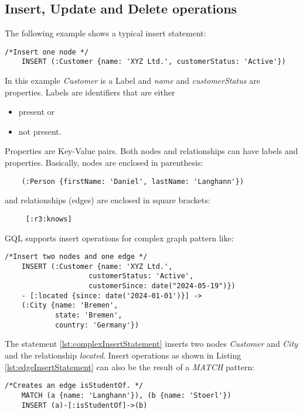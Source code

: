 \subsection{Insert, Update and Delete operations}
The following example shows a typical insert statement:
\begin{lstlisting}[caption={Typical insert statement}, label={lst:insertStatement}]
    /*Insert one node */
	INSERT (:Customer {name: 'XYZ Ltd.', customerStatus: 'Active'})
\end{lstlisting}
In this example \textit{Customer} is a Label and \textit{name} and \textit{customerStatus}
are properties.\newline
Labels are identifiers that are either
\begin{itemize}
	\item present or
	\item not present.
\end{itemize}
Properties are Key-Value pairs.\newline
Both nodes and relationships can have labels and properties.
Basically, nodes are enclosed in parenthesis:
\begin{lstlisting}
	(:Person {firstName: 'Daniel', lastName: 'Langhann'})
\end{lstlisting}
and relationships (edges) are enclosed in square brackets:
\begin{lstlisting}
	 [:r3:knows]
\end{lstlisting}\clearpage
GQL supports insert operations for complex graph pattern like:
\begin{lstlisting}[caption={Complex insert statement}, label={lst:complexInsertStatement}]
    /*Insert two nodes and one edge */
	INSERT (:Customer {name: 'XYZ Ltd.', 
					customerStatus: 'Active',
					customerSince: date("2024-05-19")})
	- [:located {since: date('2024-01-01')}] ->
	(:City {name: 'Bremen',
			state: 'Bremen',
			country: 'Germany'})
\end{lstlisting}
The statement \ref{lst:complexInsertStatement} inserts two nodes \textit{Customer} and
\textit{City} and the relationship \textit{located}.\newline
Insert operations as shown in Listing \ref{lst:edgeInsertStatement} can also be the result of a \textit{MATCH} pattern:
\begin{lstlisting}[caption={Insert statement for an edge}, label={lst:edgeInsertStatement}] 
	/*Creates an edge isStudentOf. */
	MATCH (a {name: 'Langhann'}), (b {name: 'Stoerl'})
	INSERT (a)-[:isStudentOf]->(b)
\end{lstlisting}
